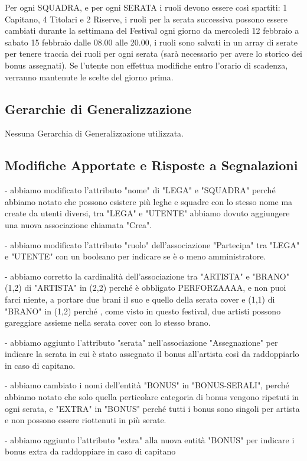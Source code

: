 \documentclass[a4paper, 12pt]{article}
\begin{document}
Per ogni SQUADRA, e per ogni SERATA i ruoli devono essere così spartiti:
1 Capitano, 4 Titolari e 2 Riserve,
i ruoli per la serata successiva possono essere cambiati durante la settimana del Festival ogni giorno da mercoledì 12 febbraio a sabato 15 febbraio dalle 08.00 alle 20.00,
i ruoli sono salvati in un array di serate per tenere traccia dei ruoli per ogni serata (sarà necessario per avere lo storico dei bonus assegnati).
Se l'utente non effettua modifiche entro l'orario di scadenza, verranno mantenute le scelte del giorno prima.

\subsection{Gerarchie di Generalizzazione}
Nessuna Gerarchia di Generalizzazione utilizzata.

\subsection{Modifiche Apportate e Risposte a Segnalazioni}

- abbiamo modificato l'attributo "nome" di "LEGA" e "SQUADRA" perché abbiamo notato che possono esistere più leghe e squadre con lo stesso nome ma create da utenti diversi, tra "LEGA" e "UTENTE" abbiamo dovuto aggiungere una nuova associazione chiamata "Crea".

- abbiamo modificato l'attributo "ruolo" dell'associazione "Partecipa" tra "LEGA" e "UTENTE" con un booleano per indicare se è o meno amministratore.

- abbiamo corretto la cardinalità dell'associazione tra "ARTISTA" e "BRANO" (1,2) di "ARTISTA" in (2,2) perché è obbligato PERFORZAAAA, e non puoi farci niente, a portare due brani il suo e quello della serata cover e (1,1) di "BRANO" in (1,2) perché , come visto in questo festival, due artisti possono gareggiare assieme nella serata cover con lo stesso brano.

- abbiamo aggiunto l'attributo "serata" nell'associazione "Assegnazione" per indicare la serata in cui è stato assegnato il bonus all'artista così da raddoppiarlo in caso di capitano.

- abbiamo cambiato i nomi dell'entità "BONUS" in "BONUS-SERALI", perché abbiamo notato che solo quella perticolare categoria di bonus vengono ripetuti in ogni serata, e "EXTRA" in "BONUS" perché tutti i bonus sono singoli per artista e non possono essere riottenuti in più serate.

- abbiamo aggiunto l'attributo "extra" alla nuova entità "BONUS" per indicare i bonus extra da raddoppiare in caso di capitano
\end{document}
